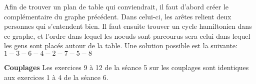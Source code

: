 \begin{figure}[h!]
  \begin{center}
  \end{center}
\end{figure}

\begin{solution}
Afin de trouver un plan de table qui conviendrait, il faut d'abord créer le complémentaire du graphe précédent. Dans celui-ci, les arêtes relient deux personnes qui s'entendent bien. Il faut ensuite trouver un cycle hamiltonien dans ce graphe, et l'ordre dans lequel les noeuds sont parcourus sera celui dans lequel les gens sont placés autour de la table. Une solution possible est la suivante:$1-3-6-4-2-7-5-8$
\end{solution}

\textbf{Couplages}
Les exercices 9 à 12 de la séance 5 sur les couplages sont identiques aux exercices 1 à 4 de la séance 6.